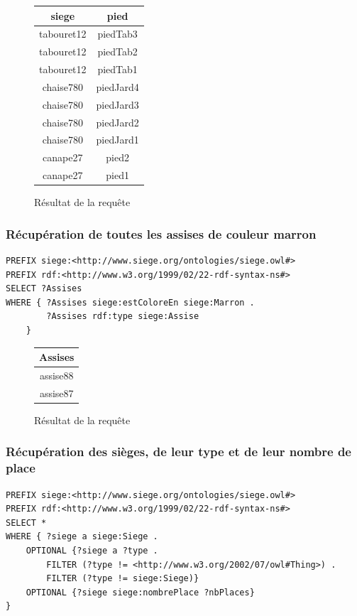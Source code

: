\documentclass[a4paper,12pt]{article}
\begin{document}
\begin{figure}[H]
	\begin{center}
		\begin{tabular}{|c|c|} 
			\hline
			\textbf{siege} & \textbf{pied} \\
			\hline
			tabouret12	& piedTab3 \\
			\hline
			tabouret12	& piedTab2 \\
			\hline
			tabouret12	& piedTab1 \\
			\hline
			chaise780 & piedJard4 \\
			\hline
			chaise780 & piedJard3 \\
			\hline
			chaise780 & piedJard2 \\
			\hline
			chaise780 & piedJard1 \\
			\hline
			canape27 & pied2 \\
			\hline
			canape27 & pied1 \\
		\end{tabular}
	\end{center}
\caption{Résultat de la requête}
\end{figure}


\subsubsection{Récupération de toutes les assises de couleur marron}
\begin{lstlisting}
PREFIX siege:<http://www.siege.org/ontologies/siege.owl#>
PREFIX rdf:<http://www.w3.org/1999/02/22-rdf-syntax-ns#>
SELECT ?Assises
WHERE { ?Assises siege:estColoreEn siege:Marron .
        ?Assises rdf:type siege:Assise
	}
\end{lstlisting}

\begin{figure}[H]
	\begin{center}
		\begin{tabular}{|c|} 
			\hline
			\textbf{Assises} \\
			\hline
			assise88 \\
			\hline
			assise87 \\
		\end{tabular}
	\end{center}
\caption{Résultat de la requête}
\end{figure}


\subsubsection{Récupération des sièges, de leur type et de leur nombre de place}
\begin{lstlisting}
PREFIX siege:<http://www.siege.org/ontologies/siege.owl#>
PREFIX rdf:<http://www.w3.org/1999/02/22-rdf-syntax-ns#>
SELECT *
WHERE { ?siege a siege:Siege .
	OPTIONAL {?siege a ?type . 
		FILTER (?type != <http://www.w3.org/2002/07/owl#Thing>) .
		FILTER (?type != siege:Siege)}
	OPTIONAL {?siege siege:nombrePlace ?nbPlaces}
}	
\end{lstlisting}
\end{document}
